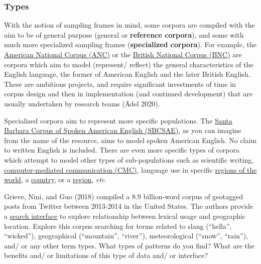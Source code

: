 \documentclass[
  letterpaper,
]{latex/krantz}
\begin{document}
\hypertarget{types}{%
\subsubsection{Types}\label{types}}

With the notion of sampling frames in mind, some corpora are compiled
with the aim to be of general purpose (general or \textbf{reference
corpora}), and some with much more specialized sampling frames
(\textbf{specialized corpora}). For example, the
\href{https://www.anc.org/}{American National Corpus (ANC)} or the
\href{http://www.natcorp.ox.ac.uk/}{British National Corpus (BNC)} are
corpora which aim to model (represent/ reflect) the general
characteristics of the English language, the former of American English
and the later British English. These are ambitious projects, and require
significant investments of time in corpus design and then in
implementation (and continued development) that are usually undertaken
by research teams (Ädel 2020).

Specialized corpora aim to represent more specific populations. The
\href{https://www.linguistics.ucsb.edu/research/santa-barbara-corpus}{Santa
Barbara Corpus of Spoken American English (SBCSAE)}, as you can imagine
from the name of the resource, aims to model spoken American English. No
claim to written English is included. There are even more specific types
of corpora which attempt to model other types of sub-populations such as
scientific writing,
\href{https://www.clarin.eu/resource-families/cmc-corpora}{computer-mediated
communication (CMC)}, language use in specific
\href{http://ice-corpora.net/ice/index.html}{regions of the world}, a
\href{https://cesa.arizona.edu}{country}, or a
\href{https://cesa.arizona.edu}{region}, \emph{etc}.

\begin{tcolorbox}[enhanced jigsaw, opacitybacktitle=0.6, breakable, colframe=quarto-callout-important-color-frame, arc=.35mm, left=2mm, leftrule=.75mm, title=\textcolor{quarto-callout-important-color}{\faExclamation}\hspace{0.5em}{Consider}, opacityback=0, colback=white, toptitle=1mm, rightrule=.15mm, titlerule=0mm, bottomtitle=1mm, bottomrule=.15mm, coltitle=black, colbacktitle=quarto-callout-important-color!10!white, toprule=.15mm]
Grieve, Nini, and Guo (2018) compiled a 8.9 billion-word corpus of
geotagged posts from Twitter between 2013-2014 in the United States. The
authors provide a \href{https://isogloss.shinyapps.io/isogloss/}{search
interface} to explore relationship between lexical usage and geographic
location. Explore this corpus searching for terms related to slang
(``hella'', ``wicked''), geographical (``mountain'', ``river''),
meteorological (``snow'', ``rain''), and/ or any other term types. What
types of patterns do you find? What are the benefits and/ or limitations
of this type of data and/ or interface?
\end{tcolorbox}
\end{document}
